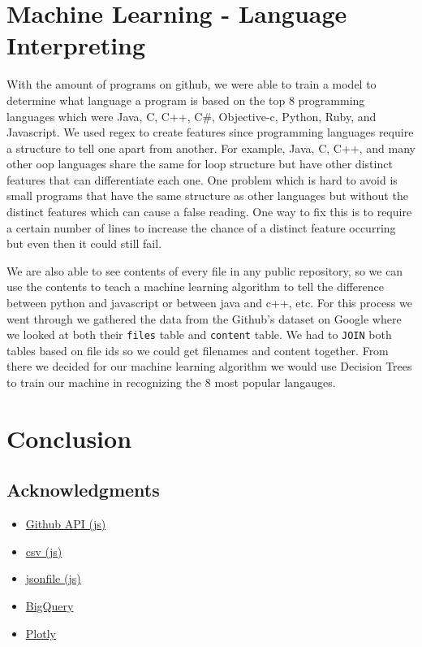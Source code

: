 \documentclass[11pt]{article}
\providecommand{\tightlist}{%
      \setlength{\itemsep}{0pt}\setlength{\parskip}{0pt}}
\begin{document}
    \section{Machine Learning - Language
Interpreting}\label{machine-learning---language-interpreting}

    With the amount of programs on github, we were able to train a model to
determine what language a program is based on the top 8 programming
languages which were Java, C, C++, C\#, Objective-c, Python, Ruby, and
Javascript. We used regex to create features since programming languages
require a structure to tell one apart from another. For example, Java,
C, C++, and many other oop languages share the same for loop structure
but have other distinct features that can differentiate each one. One
problem which is hard to avoid is small programs that have the same
structure as other languages but without the distinct features which can
cause a false reading. One way to fix this is to require a certain
number of lines to increase the chance of a distinct feature occurring
but even then it could still fail.

    We are also able to see contents of every file in any public repository,
so we can use the contents to teach a machine learning algorithm to tell
the difference between python and javascript or between java and c++,
etc. For this process we went through we gathered the data from the
Github's dataset on Google where we looked at both their \texttt{files}
table and \texttt{content} table. We had to \texttt{JOIN} both tables
based on file ids so we could get filenames and content together. From
there we decided for our machine learning algorithm we would use
Decision Trees to train our machine in recognizing the 8 most popular
langauges.

    \section{Conclusion}\label{conclusion}

    \subsection{Acknowledgments}\label{acknowledgments}

\begin{itemize}
\tightlist
\item
  \href{https://github.com/octokit/rest.js}{Github API (js)}
\item
  \href{https://www.npmjs.com/package/csv}{csv (js)}
\item
  \href{https://www.npmjs.com/package/jsonfile}{jsonfile (js)}
\item
  \href{https://bigquery.cloud.google.com}{BigQuery}
\item
  \href{https://plot.ly/python/}{Plotly}
\end{itemize}


    
    
    
    
\end{document}
